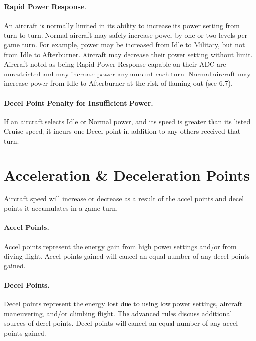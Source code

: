 \paragraph{Rapid Power Response.} An aircraft is normally limited in its ability to increase its power setting from turn to turn. Normal aircraft may safely increase power by one or two levels per game turn. For example, power may be increased from Idle to Military, but not from Idle to Afterburner. Aircraft may decrease their power setting without limit. Aircraft noted as being Rapid Power Response capable on their ADC are unrestricted and may increase power any amount each turn. Normal aircraft may increase power from Idle to Afterburner at the risk of flaming out (see 6.7).

\paragraph{Decel Point Penalty for Insufficient Power.} If an aircraft selects Idle or Normal power, and its speed is greater than its listed Cruise speed, it incurs one Decel point in addition to any others received that turn.

\section{Acceleration \& Deceleration Points}
\label{rule:acceleration-and-deceleration-points}
\label{rule:speed-change}

Aircraft speed will increase or decrease as a result of the accel points and decel points it accumulates in a game-turn. 

\paragraph{Accel Points.} Accel points represent the energy gain from high power settings and/or from diving flight. Accel points gained will cancel an equal number of any decel points gained.

\paragraph{Decel Points.} Decel points represent the energy lost due to using low power settings, aircraft maneuvering, and/or climbing flight. The advanced rules discuss additional sources of decel points. Decel points will cancel an equal number of any accel points gained.

